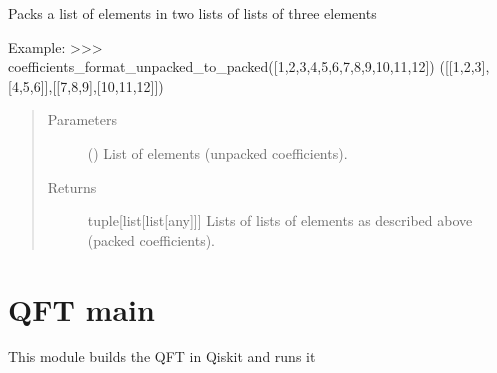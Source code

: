 \documentclass[letterpaper,10pt,english]{sphinxmanual}
\begin{document}
\begin{fulllineitems}
\label{\detokenize{coefficients_shapes:mermin_on_qiskit.coefficients_shapes.coefficients_format_unpacked_to_packed}}
Packs a list of elements in two lists of lists of three elements

Example:
\textgreater{}\textgreater{}\textgreater{}  coefficients\_format\_unpacked\_to\_packed({[}1,2,3,4,5,6,7,8,9,10,11,12{]})
({[}{[}1,2,3{]},{[}4,5,6{]}{]},{[}{[}7,8,9{]},{[}10,11,12{]}{]})
\begin{quote}\begin{description}
\item[{Parameters}] \leavevmode
{} (\sphinxstyleliteralemphasis{\sphinxupquote{{[}}}\sphinxstyleliteralemphasis{\sphinxupquote{{]}}}) \textendash{} List of elements (unpacked coefficients).

\item[{Returns}] \leavevmode
tuple{[}list{[}list{[}any{]}{]}{]} \textendash{} Lists of lists of elements as described 
above (packed coefficients).

\end{description}\end{quote}

\end{fulllineitems}



\chapter{QFT main}
\label{\detokenize{QFT:module-mermin_on_qiskit.QFT}}\label{\detokenize{QFT:qft-main}}\label{\detokenize{QFT::doc}}
This module builds the QFT in Qiskit and runs it

\begin{fulllineitems}
\label{\detokenize{QFT:mermin_on_qiskit.QFT.QFT_lenght}}
\end{fulllineitems}
\end{document}
